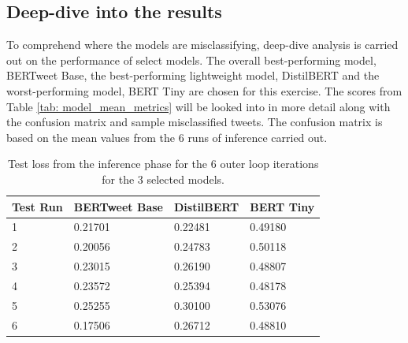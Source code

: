 \subsection{Deep-dive into the results}
To comprehend where the models are misclassifying, deep-dive analysis is carried out on the performance of select models. The overall best-performing model, BERTweet Base, the best-performing lightweight model, DistilBERT and the worst-performing model, BERT Tiny are chosen for this exercise. The scores from Table \ref{tab: model_mean_metrics} will be looked into in more detail along with the confusion matrix and sample misclassified tweets. The confusion matrix is based on the mean values from the 6 runs of inference carried out.\\
\begin{table}[ht]
    \small
    \centering
    \begin{tabularx}{\textwidth}{|X|X|X|X|}
        \hline
        \rowcolor[gray]{0.7}
        \textbf{Test Run} & \textbf{BERTweet Base} & \textbf{DistilBERT} & \textbf{BERT Tiny} \\
        \hline
        1                 & 0.21701                & 0.22481             & 0.49180            \\
        \rowcolor[gray]{0.9}
        2                 & 0.20056                & 0.24783             & 0.50118            \\
        3                 & 0.23015                & 0.26190             & 0.48807            \\
        \rowcolor[gray]{0.9}
        4                 & 0.23572                & 0.25394             & 0.48178            \\
        5                 & 0.25255                & 0.30100             & 0.53076            \\
        \rowcolor[gray]{0.9}
        6                 & 0.17506                & 0.26712             & 0.48810            \\
        \hline
    \end{tabularx}
    \caption{Test loss from the inference phase for the 6 outer loop iterations for the 3 selected models.}
    \label{tab: test_loss}
\end{table}


